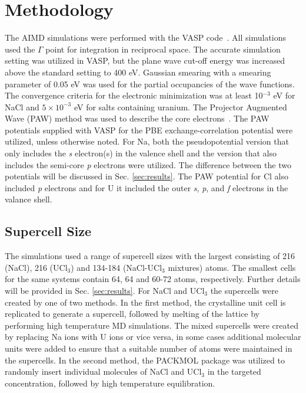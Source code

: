 \documentclass[preprint,3p,10pt,onecolumn,number,sort&compress]{elsarticle}
\begin{document}
\section{Methodology}
\label{sec:method}
The AIMD simulations were performed with the VASP code~\cite{Kresse1996}. All simulations used the $\Gamma$ point for integration in reciprocal space. The accurate simulation setting was utilized in VASP, but the plane wave cut-off energy was increased above the standard setting to 400 eV. Gaussian smearing with a smearing parameter of 0.05 eV was used for the partial occupancies of the wave functions. The convergence criteria for the electronic minimization was at least 10$^{-3}$ eV for NaCl and $5\times10^{-3}$ eV for salts containing uranium. The Projector Augmented Wave (PAW) method was used to describe the core electrons~\cite{PAW1,PAW2}. The PAW potentials supplied with VASP for the PBE exchange-correlation potential were utilized, unless otherwise noted. For Na, both the pseudopotential version that only includes the \textit{s} electron(s) in the valence shell and the version that also includes the semi-core \textit{p} electrons were utilized. The difference between the two potentials will be discussed in Sec. \ref{sec:results}. The PAW potential for Cl also included \textit{p} electrons and for U it included the outer \textit{s}, \textit{p}, and \textit{f} electrons in the valance shell. 

\subsection{Supercell Size}
The simulations used a range of supercell sizes with the largest consisting of 216 (NaCl), 216 (UCl$_3$) and 134-184 (NaCl-UCl$_3$ mixtures) atoms. The smallest cells for the same systems contain 64, 64 and 60-72 atoms, respectively. Further details will be provided in Sec. \ref{sec:results}. 
For NaCl and UCl$_3$ the supercells were created by one of two methods. In the first method, the crystalline unit cell is replicated to generate a supercell, followed by melting of the lattice by performing high temperature MD simulations. The mixed supercells were created by replacing Na ions with U ions or vice versa, in some cases additional molecular units were added to ensure that a suitable number of atoms were maintained in the supercells. In the second method, the PACKMOL package \cite{packmol} was utilized to randomly insert individual molecules of NaCl and UCl$_3$ in the targeted concentration, followed by high temperature equilibration. 
\end{document}
